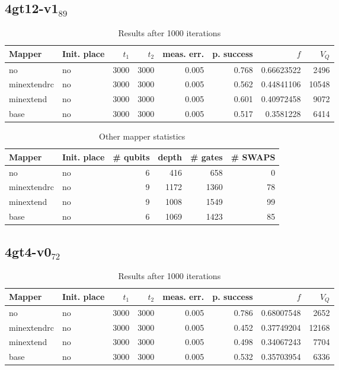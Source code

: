 \documentclass[11pt]{article}
\begin{document}
\subsection{4gt12-v1\(_{\text{89}}\)}
\label{sec:orgfb428fe}

\begin{table}[!htpb]
\caption{\label{tab:org37ff404}
Results after 1000 iterations}
\centering
\begin{tabular}{llrrrrrr}
\hline
Mapper & Init. place & \(t_1\) & \(t_2\) & meas. err. & p. success & \(f\) & \(V_Q\)\\
\hline
no & no & 3000 & 3000 & 0.005 & 0.768 & 0.66623522 & 2496\\
\hline
minextendrc & no & 3000 & 3000 & 0.005 & 0.562 & 0.44841106 & 10548\\
minextend & no & 3000 & 3000 & 0.005 & 0.601 & 0.40972458 & 9072\\
base & no & 3000 & 3000 & 0.005 & 0.517 & 0.3581228 & 6414\\
\hline
\end{tabular}
\end{table}

\begin{table}[!htpb]
\caption{\label{tab:org24c0baf}
Other mapper statistics}
\centering
\small
\begin{tabular}{llrrrr}
\hline
Mapper & Init. place & \# qubits & depth & \# gates & \# SWAPS\\
\hline
no & no & 6 & 416 & 658 & 0\\
\hline
minextendrc & no & 9 & 1172 & 1360 & 78\\
minextend & no & 9 & 1008 & 1549 & 99\\
base & no & 6 & 1069 & 1423 & 85\\
\hline
\end{tabular}
\end{table}

\subsection{4gt4-v0\(_{\text{72}}\)}
\label{sec:orgd73c8ad}

\begin{table}[!htpb]
\caption{\label{tab:org39d4b96}
Results after 1000 iterations}
\centering
\begin{tabular}{llrrrrrr}
\hline
Mapper & Init. place & \(t_1\) & \(t_2\) & meas. err. & p. success & \(f\) & \(V_Q\)\\
\hline
no & no & 3000 & 3000 & 0.005 & 0.786 & 0.68007548 & 2652\\
\hline
minextendrc & no & 3000 & 3000 & 0.005 & 0.452 & 0.37749204 & 12168\\
minextend & no & 3000 & 3000 & 0.005 & 0.498 & 0.34067243 & 7704\\
base & no & 3000 & 3000 & 0.005 & 0.532 & 0.35703954 & 6336\\
\hline
\end{tabular}
\end{table}
\end{document}
